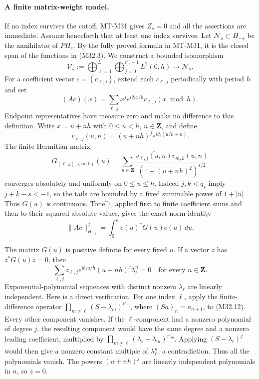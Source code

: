 \paragraph{A finite matrix-weight model.}
If no index survives the cutoff, MT-M31 gives $Z_s=0$
and all the assertions are immediate.  Assume henceforth
that at least one index survives.
Let $\mathcal N_s\subset H_{-s}$ be the annihilator of
$PH_s$.  By the fully proved formula in MT-M31,
it is the closed span of the functions in (M32.3).
We construct a bounded isomorphism
\[
 \mathcal V_s:=\bigoplus_{\ell=1}^{L}
                     \bigoplus_{j=0}^{r'_\ell-1}L^2(0,h)
                  \longrightarrow\mathcal N_s.
 \tag{M32.7}
\]
For a coefficient vector $c=(c_{\ell,j})$, extend each
$c_{\ell,j}$ periodically with period $h$ and set
\[
 (Ac)(x)=\sum_{\ell,j}
       x^j e^{i\theta_\ell x/h}c_{\ell,j}(x\bmod h).
 \tag{M32.8}
\]
Endpoint representatives have measure zero and make no
difference to this definition.  Write $x=u+nh$ with
$0\leq u<h$, $n\in\mathbf Z$, and define
\[
 v_{\ell,j}(u,n)=(u+nh)^j
                         e^{i\theta_\ell(u/h+n)}.
 \tag{M32.9}
\]
The finite Hermitian matrix
\[
 G_{(\ell,j),(m,k)}(u)
   =\sum_{n\in\mathbf Z}
       \frac{\overline{v_{\ell,j}(u,n)}v_{m,k}(u,n)}
                  {(1+(u+nh)^2)^{s/2}}
 \tag{M32.10}
\]
converges absolutely and uniformly on $0\leq u\leq h$.
Indeed $j,k<q_s$ imply $j+k-s<-1$, so the tails
are bounded by a fixed summable power of $1+|n|$.
Thus $G(u)$ is continuous.  Tonelli, applied first to
finite coefficient sums and then to their squared absolute
values, gives the exact norm identity
\[
           \|Ac\|_{H_{-s}}^2
                =\int_0^h c(u)^*G(u)c(u)\,du.
 \tag{M32.11}
\]

The matrix $G(u)$ is positive definite for every fixed $u$.
If a vector $z$ has $z^*G(u)z=0$, then
\[
       \sum_{\ell,j}z_{\ell,j}
          e^{i\theta_\ell u/h}(u+nh)^j\lambda_\ell^n=0
                       \quad\text{for every }n\in\mathbf Z.
 \tag{M32.12}
\]
Exponential-polynomial sequences with distinct nonzero
$\lambda_\ell$ are linearly independent.
Here is a direct verification.  For one index $\ell$, apply
the finite-difference operator
$\prod_{m\ne\ell}(S-\lambda_m)^{r'_m}$, where
$(Sa)_n=a_{n+1}$, to (M32.12).  Every other component
vanishes.  If the $\ell$-component had a nonzero polynomial
of degree $j$, the resulting component would have the
same degree and a nonzero leading coefficient, multiplied
by $\prod_{m\ne\ell}(\lambda_\ell-\lambda_m)^{r'_m}$.
Applying $(S-\lambda_\ell)^j$ would then give a nonzero
constant multiple of $\lambda_\ell^n$, a contradiction.
Thus all the polynomials vanish.  The powers $(u+nh)^j$
are linearly independent polynomials in $n$, so $z=0$.

